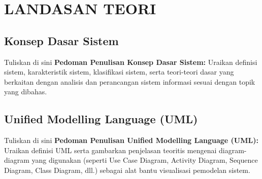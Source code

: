 \chapter{LANDASAN TEORI}
\section{Konsep Dasar Sistem}


Tuliskan di sini \textbf{Pedoman Penulisan Konsep Dasar Sistem:} Uraikan definisi sistem, karakteristik sistem, klasifikasi sistem, serta teori-teori dasar yang berkaitan dengan analisis dan perancangan sistem informasi sesuai dengan topik yang dibahas.


\section{Unified Modelling Language (UML)}


Tuliskan di sini \textbf{Pedoman Penulisan Unified Modelling Language (UML):} Uraikan definisi UML serta gambarkan penjelasan teoritis mengenai diagram-diagram yang digunakan (seperti Use Case Diagram, Activity Diagram, Sequence Diagram, Class Diagram, dll.) sebagai alat bantu visualisasi pemodelan sistem.

